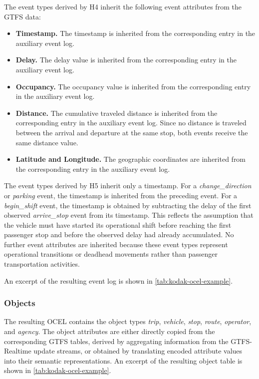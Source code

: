 The event types derived by H4 inherit the following event attributes from the GTFS data:

\begin{itemize}
    \item \textbf{Timestamp.} The timestamp is inherited from the corresponding entry in the auxiliary event log.

    \item \textbf{Delay.} The delay value is inherited from the corresponding entry in the auxiliary event log.

    \item \textbf{Occupancy.} The occupancy value is inherited from the corresponding entry in the auxiliary event log.

    \item \textbf{Distance.} The cumulative traveled distance is inherited from the corresponding entry in the auxiliary event log. Since no distance is traveled between the arrival and departure at the same stop, both events receive the same distance value.

    \item \textbf{Latitude and Longitude.} The geographic coordinates are inherited from the corresponding entry in the auxiliary event log.
\end{itemize}

The event types derived by H5 inherit only a timestamp. For a \textit{change\_direction} or \textit{parking} event, the timestamp is inherited from the preceding event. For a \textit{begin\_shift} event, the timestamp is obtained by subtracting the delay of the first observed \textit{arrive\_stop} event from its timestamp. This reflects the assumption that the vehicle must have started its operational shift before reaching the first passenger stop and before the observed delay had already accumulated. No further event attributes are inherited because these event types represent operational transitions or deadhead movements rather than passenger transportation activities.

An excerpt of the resulting event log is shown in \autoref{tab:kodak-ocel-example}.


\subsubsection{Objects}
\label{subsec:Object_table}
The resulting OCEL contains the object types \textit{trip}, \textit{vehicle}, \textit{stop}, \textit{route}, \textit{operator}, and \textit{agency}. The object attributes are either directly copied from the corresponding GTFS tables, derived by aggregating information from the GTFS-Realtime update streams, or obtained by translating encoded attribute values into their semantic representations. An excerpt of the resulting object table is shown in \autoref{tab:kodak-ocel-example}.

